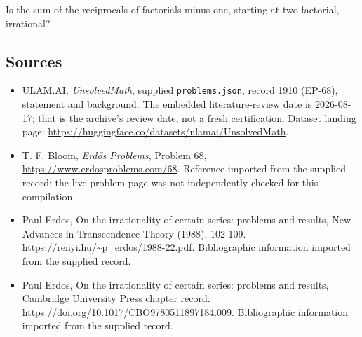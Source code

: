 \documentclass[11pt,a4paper]{article}
\begin{document}
Is the sum of the reciprocals of factorials minus one, starting at two factorial, irrational?

\subsection{Sources}

{\small

\begin{itemize}

\item[\hypertarget{source:1910:1}{S1}] ULAM.AI, \emph{UnsolvedMath}, supplied \texttt{problems.json}, record 1910 (EP-68), statement and background. The embedded literature-review date is 2026-08-17; that is the archive’s review date, not a fresh certification. Dataset landing page: \url{https://huggingface.co/datasets/ulamai/UnsolvedMath}.

\item[\hypertarget{source:1910:2}{S2}] T. F. Bloom, \emph{Erdős Problems}, Problem 68, \url{https://www.erdosproblems.com/68}. Reference imported from the supplied record; the live problem page was not independently checked for this compilation.

\item[\hypertarget{source:1910:3}{S3}] Paul Erdos, On the irrationality of certain series: problems and results, New Advances in Transcendence Theory (1988), 102-109. \url{https://renyi.hu/~p_erdos/1988-22.pdf}. Bibliographic information imported from the supplied record.

\item[\hypertarget{source:1910:4}{S4}] Paul Erdos, On the irrationality of certain series: problems and results, Cambridge University Press chapter record. \url{https://doi.org/10.1017/CBO9780511897184.009}. Bibliographic information imported from the supplied record.

\end{itemize}

}

\label{end:1910}
\end{document}
